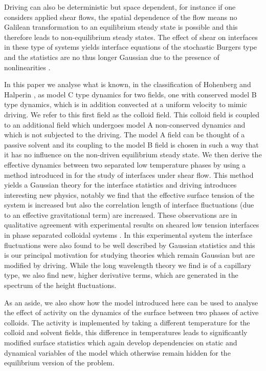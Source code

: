 Driving can also be deterministic but space dependent, for instance if one considers applied shear flows, the spatial dependence of the flow means no Galilean transformation to an equilibrium steady state is possible and this therefore leads to non-equilibrium steady states. The effect of shear on interfaces in these type of systems yields interface equations of the stochastic Burgers type and the statistics are no thus longer Gaussian due to the presence of nonlinearities \cite{bray2001,bray2002,smith2008,smith2010,thie2010,thie2014}. 

In this paper we analyse what is known, in the classification of Hohenberg and Halperin \cite{hohe1977}, as model C type dynamics for two fields, one with conserved model B type dynamics, which is in addition convected at a uniform velocity to mimic driving. We refer to this first field as the colloid field.
This colloid field is coupled to an additional field which undergoes model A non-conserved dynamics and which is not subjected to the driving. The model A field can be thought of a passive solvent and its coupling to the model B field is chosen in such a way that it has no influence on the non-driven equilibrium steady state. We then derive the effective dynamics between two separated low temperature phases by using a
method introduced in \cite{bray2001,bray2002} for the study of interfaces under shear flow. This method yields a Gaussian theory for the interface statistics and driving introduces interesting new physics, notably we find that the effective surface tension of the system is increased but also the correlation length of interface fluctuations (due to an effective gravitational term) are increased. These observations are in qualitative agreement with experimental results on sheared low tension interfaces in phase separated colloidal systems \cite{derks2006}. In this experimental system the interface fluctuations were also found to be well described by Gaussian statistics and this is our principal motivation for studying theories which remain Gaussian but are  modified by driving. While the long wavelength theory we find is of a capillary type, we also find new, higher derivative terms, which  are generated in the spectrum of the height fluctuations. 

As an aside, we also show how the model introduced here can be used to analyse the effect of activity on the dynamics of the surface between two phases of active colloids. The activity is implemented by taking a different temperature for the colloid and solvent fields, this difference in temperatures leads to significantly modified surface statistics which again develop dependencies on static and dynamical variables of the model which otherwise remain hidden for the equilibrium version of the problem.

